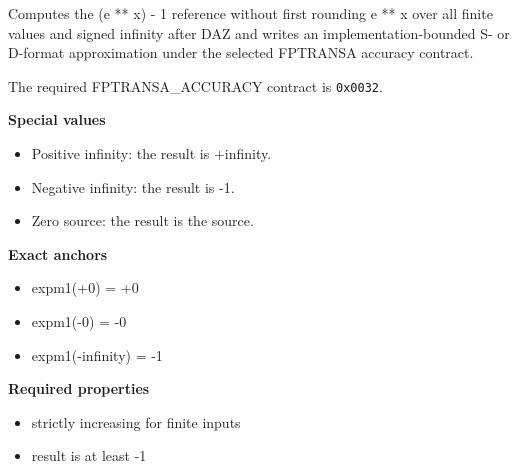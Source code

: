 Computes the (e ** x) - 1 reference without first rounding e ** x over all finite values and signed infinity after DAZ and writes an implementation-bounded S- or D-format approximation under the selected FPTRANSA accuracy contract.

The required FPTRANSA\_ACCURACY contract is \texttt{0x0032}.

\textbf{Special values}\par
\begin{itemize}
\item Positive infinity: the result is +infinity.
\item Negative infinity: the result is -1.
\item Zero source: the result is the source.
\end{itemize}

\textbf{Exact anchors}\par
\begin{itemize}
\item expm1(+0) = +0
\item expm1(-0) = -0
\item expm1(-infinity) = -1
\end{itemize}

\textbf{Required properties}\par
\begin{itemize}
\item strictly increasing for finite inputs
\item result is at least -1
\end{itemize}
